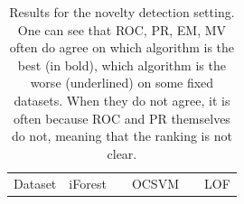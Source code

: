 \documentclass[9pt]{beamer}
\begin{document}
\begin{frame}
\begin{table}[!ht]
\centering
\footnotesize
\caption{\footnotesize Results for the novelty detection setting. One can see that ROC, PR, EM, MV often do agree on which algorithm is the best (in bold), which algorithm is the worse (underlined) on some fixed datasets. When they do not agree, it is often because ROC and PR themselves do not, meaning that the ranking is not clear.}
\tabcolsep=0.11cm
\resizebox{\linewidth}{!} {
\begin{tabular}{l cccc c cccc c cccc}
\toprule
Dataset      & \multicolumn{4}{c}{iForest}& & \multicolumn{4}{c}{OCSVM}&  & \multicolumn{4}{c}{LOF} \\ %
  \cmidrule{1-15}


\end{tabular}}
\end{table}
\end{frame}
\end{document}
